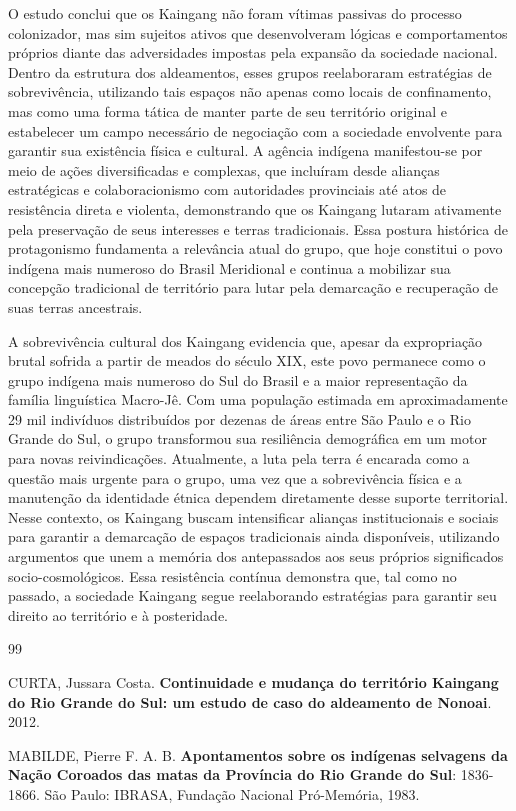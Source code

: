 \documentclass[12pt, a4paper]{article}
\begin{document}
O estudo conclui que os Kaingang não foram vítimas passivas do processo colonizador, mas sim sujeitos ativos que desenvolveram lógicas e comportamentos próprios diante das adversidades impostas pela expansão da sociedade nacional. Dentro da estrutura dos aldeamentos, esses grupos reelaboraram estratégias de sobrevivência, utilizando tais espaços não apenas como locais de confinamento, mas como uma forma tática de manter parte de seu território original e estabelecer um campo necessário de negociação com a sociedade envolvente para garantir sua existência física e cultural. A agência indígena manifestou-se por meio de ações diversificadas e complexas, que incluíram desde alianças estratégicas e colaboracionismo com autoridades provinciais até atos de resistência direta e violenta, demonstrando que os Kaingang lutaram ativamente pela preservação de seus interesses e terras tradicionais. Essa postura histórica de protagonismo fundamenta a relevância atual do grupo, que hoje constitui o povo indígena mais numeroso do Brasil Meridional e continua a mobilizar sua concepção tradicional de território para lutar pela demarcação e recuperação de suas terras ancestrais.

A sobrevivência cultural dos Kaingang evidencia que, apesar da expropriação brutal sofrida a partir de meados do século XIX, este povo permanece como o grupo indígena mais numeroso do Sul do Brasil e a maior representação da família linguística Macro-Jê. Com uma população estimada em aproximadamente 29 mil indivíduos distribuídos por dezenas de áreas entre São Paulo e o Rio Grande do Sul, o grupo transformou sua resiliência demográfica em um motor para novas reivindicações. Atualmente, a luta pela terra é encarada como a questão mais urgente para o grupo, uma vez que a sobrevivência física e a manutenção da identidade étnica dependem diretamente desse suporte territorial. Nesse contexto, os Kaingang buscam intensificar alianças institucionais e sociais para garantir a demarcação de espaços tradicionais ainda disponíveis, utilizando argumentos que unem a memória dos antepassados aos seus próprios significados socio-cosmológicos. Essa resistência contínua demonstra que, tal como no passado, a sociedade Kaingang segue reelaborando estratégias para garantir seu direito ao território e à posteridade.

\begin{thebibliography}{99}

	CURTA, Jussara Costa. \textbf{Continuidade e mudança do território Kaingang do Rio Grande do Sul: um estudo de caso do aldeamento de Nonoai}. 2012.

MABILDE, Pierre F. A. B. \textbf{Apontamentos sobre os indígenas selvagens da Nação Coroados das matas da Província do Rio Grande do Sul}: 1836-1866. São Paulo: IBRASA, Fundação Nacional Pró-Memória, 1983.

\end{thebibliography}
\end{document}
